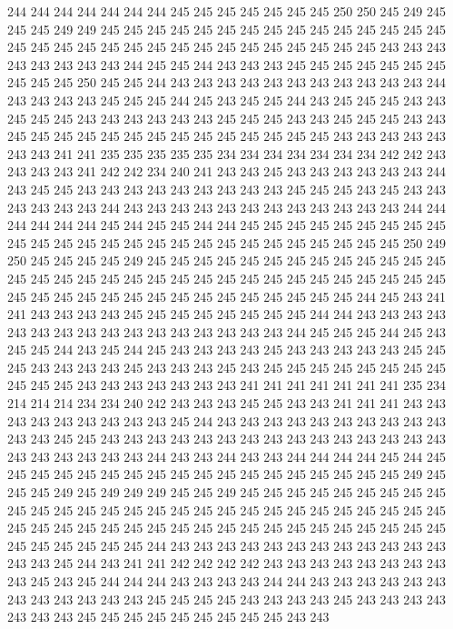 244 244 244 244 244 244 244 245 245 245 245 245 245 245 250 250 245 249 245 245
245 249 249 245 245 245 245 245 245 245 245 245 245 245 245 245 245 245 245 245
245 245 245 245 245 245 245 245 245 245 245 245 245 245 243 243 243 243 243 243
243 243 244 245 245 244 243 243 243 245 245 245 245 245 245 245 245 245 245 250
245 245 244 243 243 243 243 243 243 243 243 243 243 243 244 243 243 243 243 245
245 245 244 245 243 245 245 244 243 245 245 245 243 243 245 245 245 243 243 243
243 243 243 245 245 245 243 243 245 245 245 243 243 245 245 245 245 245 245 245
245 245 245 245 245 245 245 243 243 243 243 243 243 243 241 241 235 235 235 235
235 234 234 234 234 234 234 234 242 242 243 243 243 243 241 242 242 234 240 241
243 243 245 243 243 243 243 243 243 244 243 245 245 243 243 243 243 243 243 243
243 243 245 245 245 243 245 243 243 243 243 243 243 244 243 243 243 243 243 243
243 243 243 243 243 243 244 244 244 244 244 244 245 244 245 245 244 244 245 245
245 245 245 245 245 245 245 245 245 245 245 245 245 245 245 245 245 245 245 245
245 245 245 245 250 249 250 245 245 245 245 249 245 245 245 245 245 245 245 245
245 245 245 245 245 245 245 245 245 245 245 245 245 245 245 245 245 245 245 245
245 245 245 245 245 245 245 245 245 245 245 245 245 245 245 245 245 245 245 244
245 243 241 241 243 243 243 243 245 245 245 245 245 245 245 245 244 244 243 243
243 243 243 243 243 243 243 243 243 243 243 243 243 243 244 245 245 245 244 245
243 245 245 244 243 245 244 245 243 243 243 243 245 243 243 243 243 243 245 245
245 243 243 243 243 245 243 243 243 245 243 245 245 245 245 245 245 245 245 245
245 245 243 243 243 243 243 243 243 241 241 241 241 241 241 241 235 234 214 214
214 234 234 240 242 243 243 243 245 245 243 243 241 241 241 243 243 243 243 243
243 243 243 243 245 244 243 243 243 243 243 243 243 243 243 243 243 243 245 245
243 243 243 243 243 243 243 243 243 243 243 243 243 243 243 243 243 243 243 243
243 244 243 243 244 243 243 244 244 244 244 245 244 245 245 245 245 245 245 245
245 245 245 245 245 245 245 245 245 245 245 249 245 245 245 249 245 249 249 249
245 245 249 245 245 245 245 245 245 245 245 245 245 245 245 245 245 245 245 245
245 245 245 245 245 245 245 245 245 245 245 245 245 245 245 245 245 245 245 245
245 245 245 245 245 245 245 245 245 245 245 245 245 245 245 245 244 243 243 243
243 243 243 243 243 243 243 243 243 243 243 245 244 243 241 241 242 242 242 242
243 243 243 243 243 243 243 243 243 245 243 245 244 244 244 243 243 243 243 244
244 243 243 243 243 243 243 243 243 243 243 243 243 245 245 245 245 243 243 243
243 245 243 243 243 243 243 243 243 245 245 245 245 245 245 245 245 245 243 243
